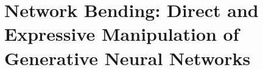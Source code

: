 \chapter{Network Bending: Direct and Expressive Manipulation of Generative Neural Networks}
\label{ch:net_bend}

